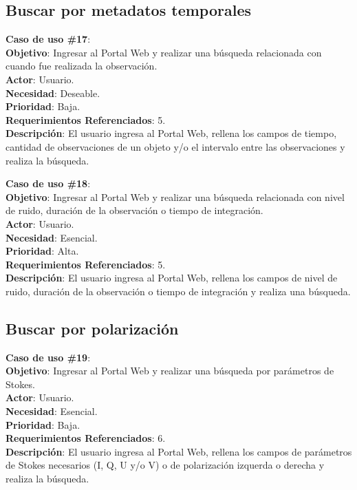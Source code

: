 \subsection{Buscar por metadatos temporales}
\noindent\textbf{Caso de uso \#17}: \\
\textbf{Objetivo}: Ingresar al Portal Web y realizar una búsqueda relacionada con cuando fue realizada la observación. \\
\textbf{Actor}: Usuario.\\
\textbf{Necesidad}: Deseable.\\
\textbf{Prioridad}: Baja.\\
\textbf{Requerimientos Referenciados}: 5. \\
\textbf{Descripción}: El usuario ingresa al Portal Web, rellena los campos de tiempo, cantidad de observaciones de un objeto y/o el intervalo entre las observaciones y realiza la búsqueda.
\vspace{1.0cm}

\noindent\textbf{Caso de uso \#18}: \\
\textbf{Objetivo}: Ingresar al Portal Web y realizar una búsqueda relacionada con nivel de ruido, duración de la observación o tiempo de integración.\\
\textbf{Actor}: Usuario.\\
\textbf{Necesidad}: Esencial.\\
\textbf{Prioridad}: Alta.\\
\textbf{Requerimientos Referenciados}: 5. \\
\textbf{Descripción}: El usuario ingresa al Portal Web, rellena los campos de nivel de ruido, duración de la observación o tiempo de integración y realiza una búsqueda.
\vspace{1.0cm}

\subsection{Buscar por polarización}
\noindent\textbf{Caso de uso \#19}: \\
\textbf{Objetivo}: Ingresar al Portal Web y realizar una búsqueda por parámetros de Stokes. \\
\textbf{Actor}: Usuario.\\
\textbf{Necesidad}: Esencial.\\
\textbf{Prioridad}: Baja.\\
\textbf{Requerimientos Referenciados}: 6. \\
\textbf{Descripción}: El usuario ingresa al Portal Web, rellena los campos de parámetros de Stokes necesarios (I, Q, U y/o V) o de polarización izquerda o derecha y realiza la búsqueda.
\vspace{1.0cm}

